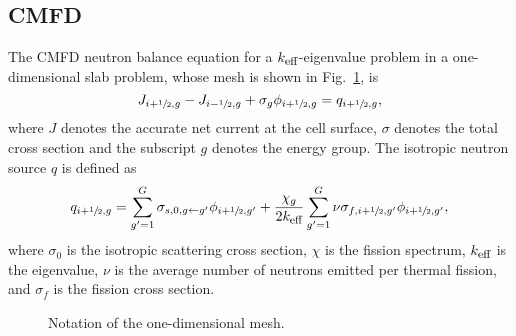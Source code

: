 \documentclass[letterpaper]{physor2020}
\newcommand{\keff}{{\ensuremath{k_{\textrm{\scriptsize{eff}}}}}}
\newcommand{\hzi}{\ensuremath{\sfrac{1}{2}}}
\begin{document}
\subsection{CMFD}
\label{sec:RM-CMFD}

The CMFD neutron balance equation for a $\keff$-eigenvalue problem in a one-dimensional slab problem, whose mesh is shown in Fig.~\ref{fig:mesh1D}, is
\begin{equation}\label{eq:balance}
J_{i+\hzi,g} - J_{i-\hzi,g} + \sigma_g \phi_{i+\hzi,g} = q_{i+\hzi,g},
\end{equation}
where $J$ denotes the accurate net current at the cell surface, $\sigma$ denotes the total cross section and the subscript $g$ denotes the energy group. The isotropic neutron source $q$ is defined as
\begin{equation}\label{eq:qsrc}
q_{i+\hzi,g} = \sum\limits_{g'=1}^G\sigma_{s,0,g\leftarrow g'}\phi_{i+\hzi,g'} +
\frac{\chi_g}{2\keff}\sum\limits_{g'=1}^G\nu\sigma_{f,i+\hzi,g'}\phi_{i+\hzi,g'},
\end{equation}
where $\sigma_0$ is the isotropic scattering cross section, $\chi$ is the fission spectrum, $\keff$ is the eigenvalue, $\nu$ is the average number of neutrons emitted per thermal fission, and $\sigma_f$ is the fission cross section.


\begin{figure}[htbp!]
	\centering
	\caption{Notation of the one-dimensional mesh.}
	\label{fig:mesh1D}
\end{figure}
\end{document}
